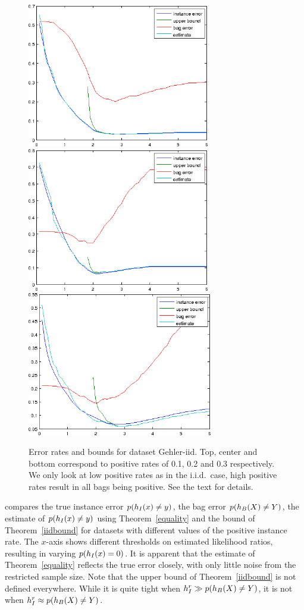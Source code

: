 \begin{figure}[tbp]
	\begin{center}
		\includegraphics[height=63mm]{images/iid_01.png}
		\includegraphics[height=63mm]{images/iid_02.png}
		\includegraphics[height=63mm]{images/iid_03.png}
	\end{center}
	\caption{Error rates and bounds for dataset Gehler-iid. Top, center and bottom correspond to positive rates of 0.1, 0.2 and 0.3 respectively.
    We only look at low positive rates as in the i.i.d.\ case, high positive rates result in all bags being positive.
    See the text for details.}
\end{figure}

 compares the true instance error $p(h_I(x) \neq y)$, the bag error $p(h_B(X) \neq Y)$, the estimate of $p(h_I(x) \neq y)$ using Theorem~\ref{equality}
and the bound of Theorem~\ref{iidbound} for datasets with different values of the positive instance rate.
The $x$-axis shows different thresholds on estimated likelihood ratios, resulting in varying $p(h_I(x)=0)$.
It is apparent that the estimate of Theorem~\ref{equality} reflects the true error closely, with only little noise from the restricted
sample size. Note that the upper bound of Theorem~\ref{iidbound} is not defined everywhere. While it is quite tight when
$h_I^r \gg p(h_B(X) \neq Y)$, it is not when $h_I^r \approx p(h_B(X) \neq Y)$.


